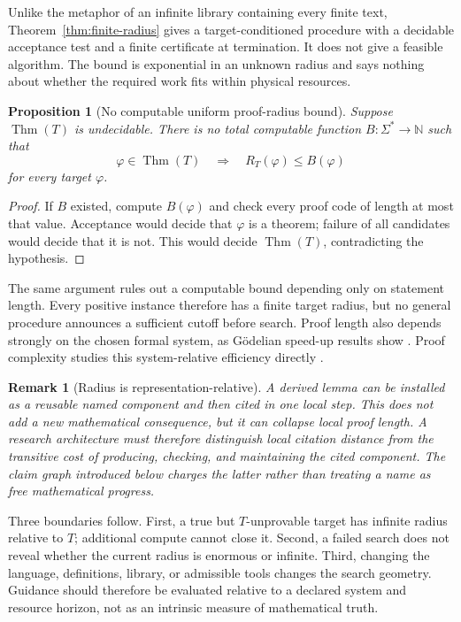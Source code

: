 \documentclass[11pt]{article}
\newtheorem{proposition}[definition]{Proposition}
\newtheorem{remark}[definition]{Remark}
\newcommand{\Thm}{\operatorname{Thm}}
\begin{document}
Unlike the metaphor of an infinite library containing every finite text,
Theorem~\ref{thm:finite-radius} gives a target-conditioned procedure with a
decidable acceptance test and a finite certificate at termination.  It does
not give a feasible algorithm.  The bound is exponential in an unknown radius
and says nothing about whether the required work fits within physical
resources.

\begin{proposition}[No computable uniform proof-radius bound]
\label{prop:no-bound}
Suppose $\Thm(T)$ is undecidable.  There is no total computable function
$B:\Sigma^*\to\mathbb N$ such that
\[
  \varphi\in\Thm(T)\quad\Longrightarrow\quad R_T(\varphi)\leq B(\varphi)
\]
for every target $\varphi$.
\end{proposition}

\begin{proof}
If $B$ existed, compute $B(\varphi)$ and check every proof code of length at
most that value.  Acceptance would decide that $\varphi$ is a theorem; failure
of all candidates would decide that it is not.  This would decide
$\Thm(T)$, contradicting the hypothesis.
\end{proof}

The same argument rules out a computable bound depending only on statement
length.  Every positive instance therefore has a finite target radius, but no
general procedure announces a sufficient cutoff before search.  Proof length
also depends strongly on the chosen formal system, as Gödelian speed-up results
show \citep{godel1936}.  Proof complexity studies this system-relative
efficiency directly \citep{cookreckhow1979}.

\begin{remark}[Radius is representation-relative]
A derived lemma can be installed as a reusable named component and then cited
in one local step.  This does not add a new mathematical consequence, but it
can collapse local proof length.  A research architecture must therefore
distinguish local citation distance from the transitive cost of producing,
checking, and maintaining the cited component.  The claim graph introduced
below charges the latter rather than treating a name as free mathematical
progress.
\end{remark}

Three boundaries follow.  First, a true but $T$-unprovable target has infinite
radius relative to $T$; additional compute cannot close it.  Second, a failed
search does not reveal whether the current radius is enormous or infinite.
Third, changing the language, definitions, library, or admissible tools changes
the search geometry.  Guidance should therefore be evaluated relative to a
declared system and resource horizon, not as an intrinsic measure of
mathematical truth.
\end{document}
